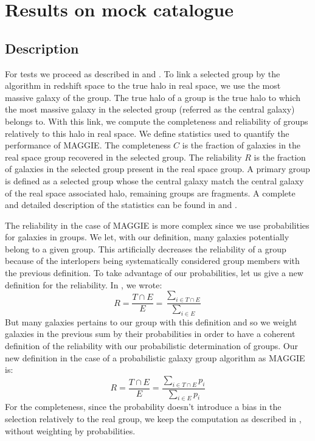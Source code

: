 \section{Results on mock catalogue}
\label{sec:results_on_mock_catalogue}

\subsection{Description}
\label{sub:maggie_tests_description}

For tests we proceed as described in \citet{Yang+07, Duarte+14} and
. To link a selected group by the
algorithm in redshift space to the true halo in real space, we use the most
massive galaxy of the group. The true halo of a group is the true halo to which
the most massive galaxy in the selected group (referred as the central galaxy)
belongs to. With this link, we compute the completeness and reliability of
groups relatively to this halo in real space. We define statistics used to
quantify the performance of MAGGIE\@. The completeness $C$ is the fraction of
galaxies in the real space group recovered in the selected group. The
reliability $R$ is the fraction of galaxies in the selected group present in
the real space group. A primary group is defined as a selected group whose the
central galaxy match the central galaxy of the real space associated halo,
remaining groups are fragments. A complete and detailed description of the
statistics can be found in \citet{Duarte+14} and
.

The reliability in the case of MAGGIE is more complex since we use
probabilities for galaxies in groups. We let, with our definition, many
galaxies potentially belong to a given group. This artificially decreases
the reliability of a group because of the interlopers being systematically
considered group members with the previous definition. To take advantage of
our probabilities, let us give a new definition for the reliability. In
\citet{DM+14a}, we wrote:
%
\begin{equation}
    R=\frac{T \cap E}{E}=\frac{\sum_{i\in T\cap E}}{\sum_{i\in E}}
\end{equation}
%
But many galaxies pertains to our group with this definition and so we
weight galaxies in the previous sum by their probabilities in order to have
a coherent definition of the reliability with our probabilistic
determination of groups. Our new definition in the case of a probabilistic
galaxy group algorithm as MAGGIE is:
%
\begin{equation}
    R=\frac{T \cap E}{E}=\frac{\sum_{i\in T\cap E} p_i}{\sum_{i\in E}p_i}
\end{equation}
%
For the completeness, since the probability doesn't introduce a bias in the
selection relatively to the real group, we keep the computation as described
in \citet{DM+14a}, without weighting by probabilities.


